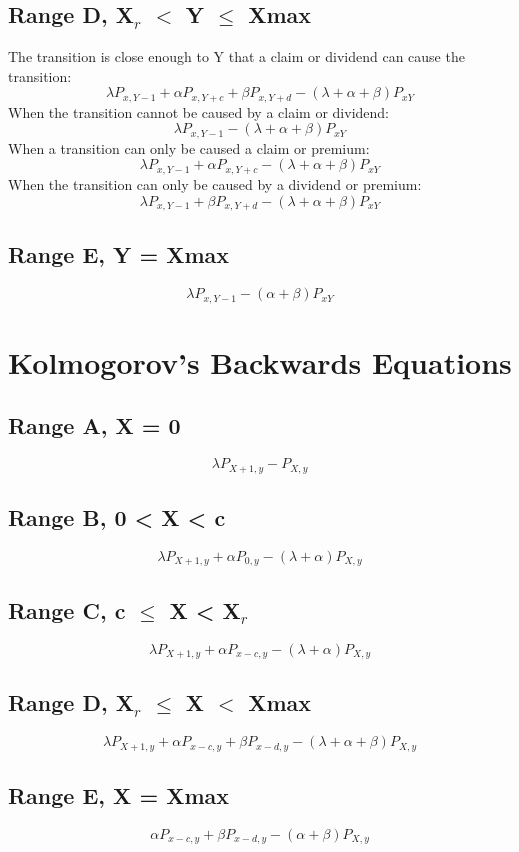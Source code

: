 \documentclass[]{article}
\begin{document}
\subsection{Range D, X$_r$ $<$ Y $\leq$ Xmax}
The transition is close enough to Y that a claim or dividend can cause the transition:
$$\lambda P_{x,Y-1} + \alpha P_{x, Y+c} + \beta P_{x, Y+d} - (\lambda + \alpha + \beta)P_{xY}$$
When the transition cannot be caused by a claim or dividend:
$$\lambda P_{x,Y-1} - (\lambda + \alpha + \beta)P_{xY}$$
When a transition can only be caused a claim or premium:
$$\lambda P_{x,Y-1} + \alpha P_{x, Y+c} - (\lambda + \alpha + \beta)P_{xY}$$
When the transition can only be caused by a dividend or premium:
$$\lambda P_{x,Y-1} + \beta P_{x, Y+d} - (\lambda + \alpha + \beta)P_{xY}$$
\subsection{Range E, Y = Xmax}
$$\lambda P_{x,Y-1} - (\alpha + \beta)P_{xY}$$

\section{Kolmogorov's Backwards Equations}
\subsection{Range A, X = 0}
$$\lambda P_{X+1, y} - P_{X,y}$$
\subsection{Range B, 0 < X < c}
$$\lambda P_{X+1, y} + \alpha P_{0, y} - (\lambda + \alpha) P_{X,y}$$
\subsection{Range C, c $\leq$ X < X$_r$}
$$\lambda P_{X+1, y} + \alpha P_{x-c, y} - (\lambda + \alpha) P_{X,y}$$
\subsection{Range D, X$_r$ $\leq$ X $<$ Xmax}
$$\lambda P_{X+1, y} + \alpha P_{x-c, y} + \beta P_{x-d, y} - (\lambda + \alpha + \beta) P_{X,y}$$
\subsection{Range E, X = Xmax}
$$\alpha P_{x-c, y} + \beta P_{x-d, y} - (\alpha + \beta) P_{X,y}$$
\end{document}
